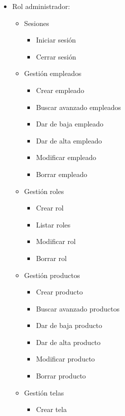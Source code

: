     \begin{itemize}
        \item Rol administrador:
        \begin{itemize}
            \item Sesiones
            \begin{itemize}
                \item Iniciar sesión
                \item Cerrar sesión
            \end{itemize}
            \item Gestión empleados
            \begin{itemize}
                \item Crear empleado
                \item Buscar avanzado empleados
                \item Dar de baja empleado
                \item Dar de alta empleado
                \item Modificar empleado
                \item Borrar empleado
            \end{itemize}
            \item Gestión roles
            \begin{itemize}
                \item Crear rol
                \item Listar roles
                \item Modificar rol
                \item Borrar rol
            \end{itemize}
            \item Gestión productos
            \begin{itemize}
                \item Crear producto
                \item Buscar avanzado productos
                \item Dar de baja producto
                \item Dar de alta producto
                \item Modificar producto
                \item Borrar producto
            \end{itemize}
            \item Gestión telas
            \begin{itemize}
                \item Crear tela

\end{itemize}
\end{itemize}
\end{itemize}
